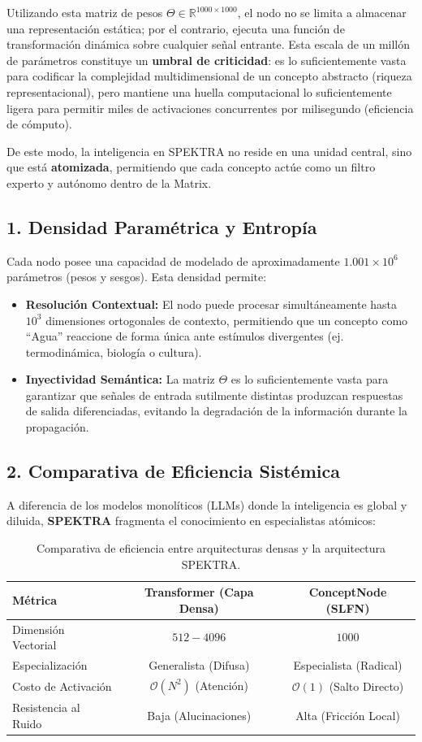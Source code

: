 \documentclass[12pt]{article}
\begin{document}
Utilizando esta matriz de pesos $\Theta \in \mathbb{R}^{1000 \times 1000}$, el nodo no se limita a almacenar una representación estática; por el contrario, ejecuta una función de transformación dinámica sobre cualquier señal entrante. Esta escala de un millón de parámetros constituye un \textbf{umbral de criticidad}: es lo suficientemente vasta para codificar la complejidad multidimensional de un concepto abstracto (riqueza representacional), pero mantiene una huella computacional lo suficientemente ligera para permitir miles de activaciones concurrentes por milisegundo (eficiencia de cómputo).

De este modo, la inteligencia en SPEKTRA no reside en una unidad central, sino que está \textbf{atomizada}, permitiendo que cada concepto actúe como un filtro experto y autónomo dentro de la Matrix.

\subsection{1. Densidad Paramétrica y Entropía}
Cada nodo posee una capacidad de modelado de aproximadamente $1.001 \times 10^6$ parámetros (pesos y sesgos). Esta densidad permite:
\begin{itemize}
	\item \textbf{Resolución Contextual:} El nodo puede procesar simultáneamente hasta $10^3$ dimensiones ortogonales de contexto, permitiendo que un concepto como ``Agua'' reaccione de forma única ante estímulos divergentes (ej. termodinámica, biología o cultura).
	\item \textbf{Inyectividad Semántica:} La matriz $\Theta$ es lo suficientemente vasta para garantizar que señales de entrada sutilmente distintas produzcan respuestas de salida diferenciadas, evitando la degradación de la información durante la propagación.
\end{itemize}

\subsection{2. Comparativa de Eficiencia Sistémica}
A diferencia de los modelos monolíticos (LLMs) donde la inteligencia es global y diluida, \textbf{SPEKTRA} fragmenta el conocimiento en especialistas atómicos:

\begin{table}[h]
	\centering
	\begin{tabular}{|l|c|c|}
		\hline
		\textbf{Métrica} & \textbf{Transformer (Capa Densa)} & \textbf{ConceptNode (SLFN)} \\ \hline
		Dimensión Vectorial & $512 - 4096$ & $1000$ \\ \hline
		Especialización & Generalista (Difusa) & Especialista (Radical) \\ \hline
		Costo de Activación & $\mathcal{O}(N^2)$ (Atención) & $\mathcal{O}(1)$ (Salto Directo) \\ \hline
		Resistencia al Ruido & Baja (Alucinaciones) & Alta (Fricción Local) \\ \hline
	\end{tabular}
	\caption{Comparativa de eficiencia entre arquitecturas densas y la arquitectura SPEKTRA.}
\end{table}
\end{document}
